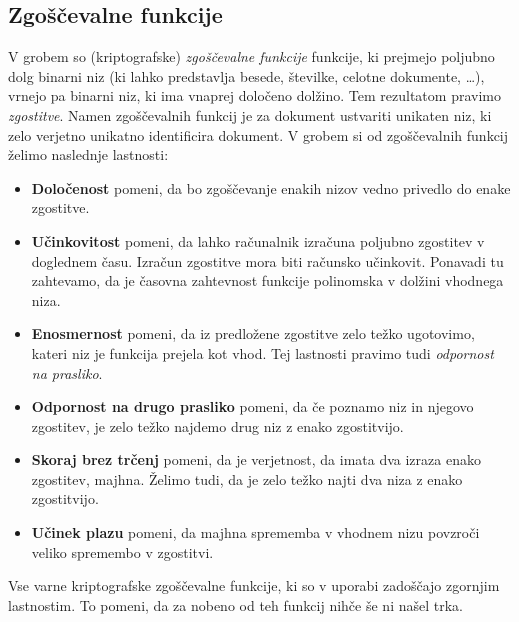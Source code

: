 \documentclass[isrm2, tisk]{fmfdelo}
\begin{document}
\subsection{Zgoščevalne funkcije}
V grobem so (kriptografske) \textit{zgoščevalne funkcije} funkcije, ki prejmejo poljubno dolg binarni 
niz (ki lahko predstavlja besede, številke, celotne dokumente, \dots), vrnejo pa binarni niz, ki ima
vnaprej določeno dolžino. Tem rezultatom pravimo \textit{zgostitve}. Namen zgoščevalnih funkcij je 
za dokument ustvariti unikaten niz, ki zelo verjetno unikatno identificira dokument. V grobem si od 
zgoščevalnih funkcij želimo naslednje lastnosti:
\begin{itemize}
    \item \textbf{Določenost} pomeni, da bo zgoščevanje enakih nizov vedno privedlo do enake 
        zgostitve. 
    \item \textbf{Učinkovitost} pomeni, da lahko računalnik izračuna poljubno zgostitev v doglednem 
        času. Izračun zgostitve mora biti računsko učinkovit. Ponavadi tu zahtevamo, da je časovna
        zahtevnost funkcije polinomska v dolžini vhodnega niza.
    \item \textbf{Enosmernost} pomeni, da iz predložene zgostitve zelo težko ugotovimo, kateri niz
        je funkcija prejela kot vhod. Tej lastnosti pravimo tudi \textit{odpornost na prasliko}.
    \item \textbf{Odpornost na drugo prasliko} pomeni, da če poznamo niz in njegovo zgostitev, 
        je zelo težko najdemo drug niz z enako zgostitvijo.
    \item \textbf{Skoraj brez trčenj} pomeni, da je verjetnost, da imata dva izraza enako zgostitev,
        majhna. Želimo tudi, da je zelo težko najti dva niza z enako zgostitvijo.
    \item \textbf{Učinek plazu} pomeni, da majhna sprememba v vhodnem nizu povzroči veliko spremembo 
        v zgostitvi.
\end{itemize}

\begin{opomba}
    Vse varne kriptografske zgoščevalne funkcije, ki so v uporabi zadoščajo zgornjim lastnostim. To
    pomeni, da za nobeno od teh funkcij nihče še ni našel trka.
\end{opomba}
\end{document}
